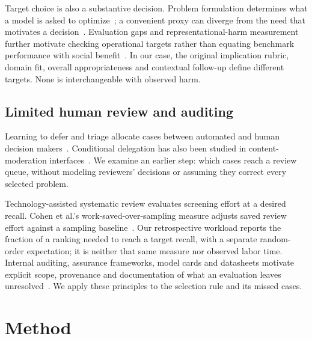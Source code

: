 Target choice is also a substantive decision. Problem formulation determines what a model is asked to optimize~\cite{passi2019formulation}; a convenient proxy can diverge from the need that motivates a decision~\cite{obermeyer2019dissecting}. Evaluation gaps and representational-harm measurement further motivate checking operational targets rather than equating benchmark performance with social benefit~\cite{hutchinson2022gaps,chien2024beyond}. In our case, the original implication rubric, domain fit, overall appropriateness and contextual follow-up define different targets. None is interchangeable with observed harm.

\subsection{Limited human review and auditing}
Learning to defer and triage allocate cases between automated and human decision makers~\cite{mozannar2020defer,okati2021triage,alves2025openl2d}. Conditional delegation has also been studied in content-moderation interfaces~\cite{lai2022moderation}. We examine an earlier step: which cases reach a review queue, without modeling reviewers' decisions or assuming they correct every selected problem.

Technology-assisted systematic review evaluates screening effort at a desired recall. Cohen et al.'s work-saved-over-sampling measure adjusts saved review effort against a sampling baseline~\cite{cohen2006review}. Our retrospective workload reports the fraction of a ranking needed to reach a target recall, with a separate random-order expectation; it is neither that same measure nor observed labor time. Internal auditing, assurance frameworks, model cards and datasheets motivate explicit scope, provenance and documentation of what an evaluation leaves unresolved~\cite{raji2020accountability,lam2024assurance,mitchell2019modelcards,gebru2021datasheets}. We apply these principles to the selection rule and its missed cases.

\section{Method}

